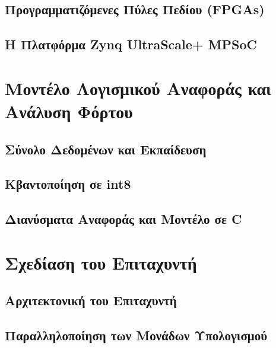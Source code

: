 \subsection{Προγραμματιζόμενες Πύλες Πεδίου (\textlatin{FPGAs})}

\subsection{Η Πλατφόρμα \textlatin{Zynq UltraScale+ MPSoC}}

\section{Μοντέλο Λογισμικού Αναφοράς και Ανάλυση Φόρτου}

\subsection{Σύνολο Δεδομένων και Εκπαίδευση}

\subsection{Κβαντοποίηση σε \textlatin{int8}}

\subsection{Διανύσματα Αναφοράς και Μοντέλο σε \textlatin{C}}

\section{Σχεδίαση του Επιταχυντή}

\subsection{Αρχιτεκτονική του Επιταχυντή}

\subsection{Παραλληλοποίηση των Μονάδων Υπολογισμού}


